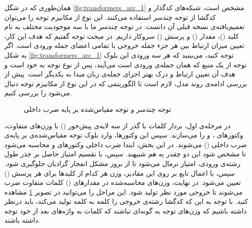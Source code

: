 {    همان‌طوری که در شگل 
    \ref{fig:transformers_arc_1} 
    مشخص است، شبکه‌های کدگذار و کدگشا از توجه چندسر استفاده می‌کنند. 
    این نوع از مکانیزم توجه را می‌توان تعمیم‌یافته‌ی نسخه قبلی آن دانست. 
    در توجه چندسر ما با سه موجودیت مختلف به نام کلید 
    ()، 
    مقدار 
    ()
     و پرسش 
    ()
    سروکار داریم. 
    در مبحث توجه گفتیم که هدف این کار، تعیین میزان ارتباط بین هر جزء جمله خروجی
    با تمامی اعضای جمله ورودی است.
    اگر به شکل 
    \ref{fig:transformers_arc_1} 
    توجه کنید، می‌بینید که هر سه ورودی این بلوک توجه 
    از یک منبع که همان جمله‌ی ورودی است می‌آیند، پس از نوع توجه به خود  
    است و هدف آن تعیین ارتباط و درک بهتر اجزای جمله‌ی زبان مبدا به یکدیگر است.
    پیش از بررسی ادامه‌ی روند مدل، لازم است تا الگوریتمی
    که در این نوع از مکانیزم توجه دنبال می‌شود را بررسی کنیم.
    
    \begin{figure}[H]
        \caption{توجه چندسر و توجه مقیاس‌شده بر پایه ضرب داخلی}
        \label{fig:multihead_attn_1}
    \end{figure}

    در مرحله‌ی اول، بردار کلمات با گذر از سه لایه‌ی پیش‌خور 
    ()
    با وزن‌های متفاوت، وکتورهای 
    ،  و  
    را می‌سازند. سپس این وکتورها، وارد بلوک توجه مقیاس‌شده‌ی بر پایه‌ی ضرب داخلی
    ()
    می‌شوند. در این بخش، ابتدا ضرب داخلی وکتورهای 
     و  
    محاسبه می‌شود تا مشخص شود این دو چقدر به هم شبیهند.
    سپس، با تقسیم امتیاز حاصل بر جذر طول رشته‌ی ورودی، 
    امتیاز نرمال می‌شود تا از بروز مشکل انفجار گرادیان جلوگیری شود.
    سپس، با اعمال تابع 
    بر روی این مقادیر، وزن هر کدام از کلیدها برای هر پرسش 
    () 
    تعیین می‌شود. در نهایت، وزن‌های محاسبه‌شده در مقدارهای 
    ()
    کلمات متفاوت ضرب می‌شوند تا خروجی مورد نظر تولید شود. 
    این مراحل را می‌توانید در تصویر
    \ref{fig:multihead_attn_1}
    مشاهده کنید.
    با توجه به این که کدگشا رشته‌ی خروجی را کلمه به کلمه تولید می‌کند،
    باید درنظر داشته باشیم که وزن‌های توجه به گونه‌ای نباشند که کلمات به
    واژه‌های بعد از خود توجه داشته باشند.

}
